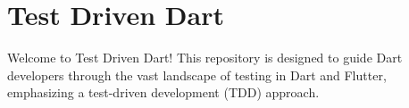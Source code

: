 \documentclass[
]{article}
\author{}
\date{}
\providecommand{\tightlist}{%
  \setlength{\itemsep}{0pt}\setlength{\parskip}{0pt}}
\begin{document}
\section{Test Driven Dart}\label{test-driven-dart}

Welcome to Test Driven Dart! This repository is designed to guide Dart
developers through the vast landscape of testing in Dart and Flutter,
emphasizing a test-driven development (TDD) approach.





\end{document}
